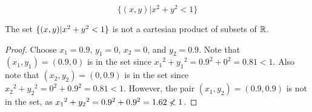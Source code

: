 \documentclass[main.tex]{subfiles}
\begin{document}
\subproblem{}\label{10e}

\[\{(x, y) | x^2 + y^2 < 1\}\]

\begin{thm}
	The set \(\{(x,y)|x^2 + y^2 < 1\}\) is not a cartesian product
	of subsets of \(\mathbb{R}\).
\end{thm}
\begin{proof}
	Choose \(x_1 = 0.9\), \(y_1 = 0\), \(x_2 = 0\), and \(y_2 = 0.9\). Note
	that \((x_1,y_1) = (0.9,0)\) is in the set since
	\({x_1}^2 + {y_1}^2 = {0.9}^2 + {0}^2 = 0.81 < 1\). Also note that
	\((x_2,y_2) = (0,0.9)\) is in the set since
	\({x_2}^2 + {y_2}^2 = {0}^2 + {0.9}^2 = 0.81 < 1\). However, the pair
	\((x_1,y_2) = (0.9,0.9)\) is not in the set, as
	\({x_1}^2 + {y_2}^2 = {0.9}^2 + {0.9}^2 = 1.62 \centernot< 1\).
\end{proof}
\end{document}
